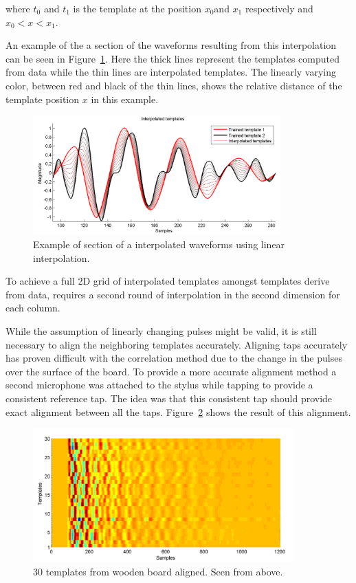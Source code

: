 where $t_0$ and $t_1$ is the template at the position $x_0$and $x_1$ respectively and \linebreak[0]$x_0 < x < x_1$.

An example of the a section of the waveforms resulting from this interpolation can be seen in Figure~\ref{fig:InterpData}. Here the thick lines represent the templates computed from data while the thin lines are interpolated templates. The linearly varying color, between red and black of the thin lines, shows the relative distance of the template position $x$ in this example.

\begin{figure}[!]
\centering
\includegraphics[width=360px]{InterpData.pdf}
\caption{Example of section of a interpolated waveforms using linear interpolation.}\label{fig:InterpData}
\end{figure}

To achieve a full 2D grid of interpolated templates amongst templates derive from data, requires a second round of interpolation in the second dimension for each column.

While the assumption of linearly changing pulses might be valid, it is still necessary to align the neighboring templates accurately. Aligning taps accurately has proven difficult with the correlation method due to the change in the pulses over the surface of the board. To provide a more accurate alignment method a second microphone was attached to the stylus while tapping to provide a consistent reference tap. The idea was that this consistent tap should provide exact alignment between all the taps. Figure~\ref{fig:templatesAligned} shows the result of this alignment.

\begin{figure}[!]
\centering
\includegraphics[width=380px]{templatesAligned.pdf}
\caption{30 templates from wooden board aligned. Seen from above.}\label{fig:templatesAligned}
\end{figure}

